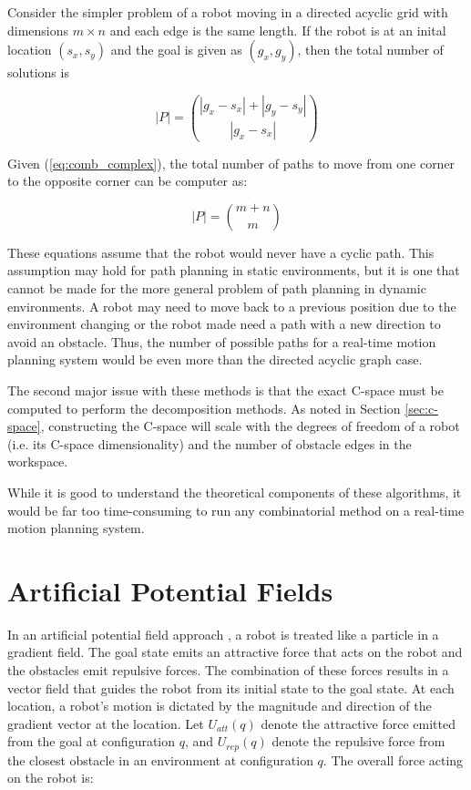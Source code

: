 \documentclass[10pt,conference]{ieeeconf}
\begin{document}
Consider the simpler problem of a robot moving in a directed acyclic grid with dimensions $m \times n$ and each edge is the same length. If the robot is at an inital location $(s_x, s_y)$ and the goal is given as $(g_x, g_y)$, then the total number of solutions is 

\begin{equation}\label{eq:comb_complex}
|P| = { |g_x-s_x|+|g_y-s_y| \choose |g_x-s_x| }
\end{equation}

Given (\ref{eq:comb_complex}), the total number of paths to move from one corner to the opposite corner can be computer as:

\begin{equation}
|P| = {m+n \choose m}
\end{equation}

These equations assume that the robot would never have a cyclic path. This assumption may hold for path planning in static environments, but it is one that cannot be made for the more general problem of path planning in dynamic environments. A robot may need to move back to a previous position due to the environment changing or the robot made need a path with a new direction to avoid an obstacle. Thus, the number of possible paths for a real-time motion planning system would be even more than the directed acyclic graph case. 


The second major issue with these methods is that the exact C-space must be computed to perform the decomposition methods. As noted in Section \ref{sec:c-space}, constructing the C-space will scale with the degrees of freedom of a robot (i.e. its C-space dimensionality) and the number of obstacle edges in the workspace.

While it is good to understand the theoretical components of these algorithms, it would be far too time-consuming to run any combinatorial method on a real-time motion planning system. 




\section{Artificial Potential Fields} \label{sec:potfields}

In an artificial potential field approach \cite{khatib1986real}, a robot is treated like a particle in a gradient field. The goal state emits an attractive force that acts on the robot and the obstacles emit repulsive forces. The combination of these forces results in a vector field that guides the robot from its initial state to the goal state. At each location, a robot's motion is dictated by the magnitude and direction of the gradient vector at the location. Let $U_{att}(q)$ denote the attractive force emitted from the goal at configuration $q$, and $U_{rep}(q)$ denote the repulsive force from the closest obstacle in an environment at configuration $q$. The overall force acting on the robot is:
\end{document}

